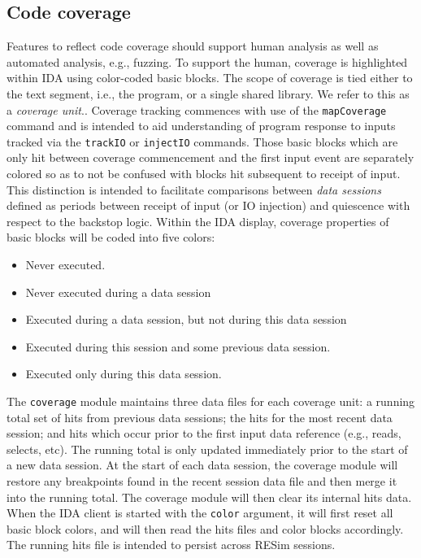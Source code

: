 \documentclass[titlepage]{article}
\begin{document}
\subsection{Code coverage}
\label{coverage}
Features to reflect code coverage should support human analysis as well as automated analysis, e.g., fuzzing.  To support the human, coverage is highlighted within IDA using color-coded
basic blocks.  The scope of coverage is tied either to the text segment, i.e., the program, or a single shared library.  We refer to this as a \textit{coverage unit}..  
Coverage tracking commences with use of the {\tt mapCoverage} command and is intended to aid understanding of program response to inputs tracked via 
the {\tt trackIO} or {\tt injectIO} commands.  Those basic blocks which are only hit between coverage commencement and the first input event are separately colored so as to not
be confused with blocks hit subsequent to receipt of input.  This distinction is intended to facilitate comparisons between \textit{data sessions} defined as periods
between receipt of input (or IO injection) and quiescence with respect to the backstop logic.
Within the IDA display, coverage properties of basic blocks will be
coded into five colors:
\begin{itemize}
\item Never executed.
\item Never executed during a data session
\item Executed during a data session, but not during this data session
\item Executed during this session and some previous data session.
\item Executed only during this data session.
\end{itemize}

The {\tt coverage} module maintains three data files for each coverage unit: a running total set of hits from previous data sessions; the hits for the most recent data session;
and hits which occur prior to the first input data reference (e.g., reads, selects, etc).  The running total is only updated immediately prior to the start 
of a new data session.  At the start of each data session, the coverage module will restore any breakpoints found
in the recent session data file and then merge it into the running total.  The coverage module will then clear its internal hits data.  
When the IDA client is started with the {\tt color} argument, it will first
reset all basic block colors,  and will then read the hits files and color blocks accordingly.  The running hits file is intended to persist across
RESim sessions.  
\end{document}
